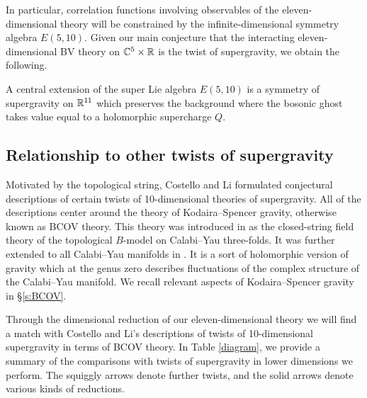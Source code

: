 In particular, correlation functions involving observables of the eleven-dimensional theory will be constrained by the infinite-dimensional symmetry algebra $E(5,10)$. 
Given our main conjecture that the interacting eleven-dimensional BV theory on $\mathbb C^5 \times \mathbb R$ is the twist of supergravity, we obtain the following.

\begin{conj} 
A central extension of the super Lie algebra $E(5,10)$ is a symmetry of supergravity on $\mathbb R^{11}$ which preserves the background where the bosonic ghost takes value equal to a holomorphic supercharge $Q$.
\end{conj}

\subsection*{Relationship to other twists of supergravity} 

Motivated by the topological string, Costello and Li formulated conjectural descriptions of certain twists of 10-dimensional theories of supergravity. 
All of the descriptions center around the theory of Kodaira--Spencer gravity, otherwise known as BCOV theory. 
This theory was introduced in \cite{BCOV} as the closed-string field theory of the topological $B$-model on Calabi--Yau three-folds.
It was further extended to all Calabi--Yau manifolds in \cite{CLbcov1}. 
It is a sort of holomorphic version of gravity which at the genus zero  describes fluctuations of the complex structure of the Calabi--Yau manifold. 
We recall relevant aspects of Kodaira--Spencer gravity in \S\ref{s:BCOV}. 

Through the dimensional reduction of our eleven-dimensional theory we will find a match with Costello and Li's descriptions of twists of 10-dimensional supergravity in terms of BCOV theory.
In Table \ref{diagram}, we provide a summary of the comparisons with twists of supergravity in lower dimensions we perform. The squiggly arrows denote further twists, and the solid arrows denote various kinds of reductions. 

